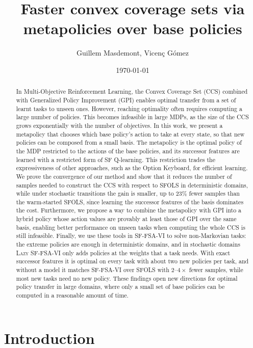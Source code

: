 \documentclass[11pt]{article}
\title{Faster convex coverage sets via metapolicies over base policies}
\author{Guillem Masdemont, Vicenç Gómez}
\date{\today}
\begin{document}
\maketitle


\begin{abstract}
    In Multi-Objective Reinforcement Learning, the Convex Coverage Set (CCS) combined with Generalized Policy Improvement (GPI) enables optimal transfer from a set of learnt tasks to unseen ones. However, reaching optimality often requires computing a large number of policies. This becomes infeasible in large MDPs, as the size of the CCS grows exponentially with the number of objectives. In this work, we present a metapolicy that chooses which base policy's action to take at every state, so that new policies can be composed from a small basis. The metapolicy is the optimal policy of the MDP restricted to the actions of the base policies, and its successor features are learned with a restricted form of SF Q-learning. This restriction trades the expressiveness of other approaches, such as the Option Keyboard, for efficient learning. We prove the convergence of our method and show that it reduces the number of samples needed to construct the CCS with respect to SFOLS in deterministic domains, while under stochastic transitions the gain is smaller, up to $23\%$ fewer samples than the warm-started SFOLS, since learning the successor features of the basis dominates the cost. Furthermore, we propose a way to combine the metapolicy with GPI into a hybrid policy whose action values are provably at least those of GPI over the same basis, enabling better performance on unseen tasks when computing the whole CCS is still infeasible. Finally, we use these tools in SF-FSA-VI to solve non-Markovian tasks: the extreme policies are enough in deterministic domains, and in stochastic domains \textsc{Lazy SF-FSA-VI} only adds policies at the weights that a task needs. With exact successor features it is optimal on every task with about two new policies per task, and without a model it matches SF-FSA-VI over SFOLS with $2$--$4\times$ fewer samples, while most new tasks need no new policy. These findings open new directions for optimal policy transfer in large domains, where only a small set of base policies can be computed in a reasonable amount of time.
\end{abstract}

\section{Introduction}
\end{document}
